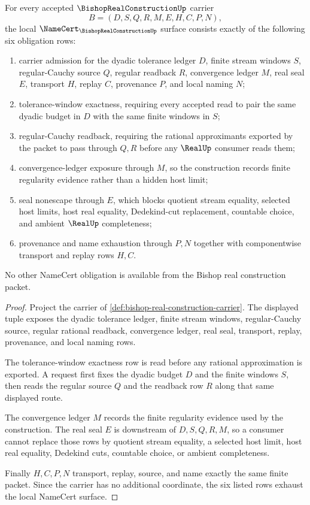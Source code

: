 \begin{theorem}
\label{thm:bishop-real-construction-namecert-obligations}
For every accepted $\BishopRealConstructionUp$ carrier
$$
B=(D,S,Q,R,M,E,H,C,P,N),
$$
the local $\NameCert_{\BishopRealConstructionUp}$ surface consists exactly of the following six obligation rows:
\begin{enumerate}
\item carrier admission for the dyadic tolerance ledger $D$, finite stream windows $S$, regular-Cauchy source $Q$, regular readback $R$, convergence ledger $M$, real seal $E$, transport $H$, replay $C$, provenance $P$, and local naming $N$;
\item tolerance-window exactness, requiring every accepted read to pair the same dyadic budget in $D$ with the same finite windows in $S$;
\item regular-Cauchy readback, requiring the rational approximants exported by the packet to pass through $Q,R$ before any $\RealUp$ consumer reads them;
\item convergence-ledger exposure through $M$, so the construction records finite regularity evidence rather than a hidden host limit;
\item seal nonescape through $E$, which blocks quotient stream equality, selected host limits, host real equality, Dedekind-cut replacement, countable choice, and ambient $\RealUp$ completeness;
\item provenance and name exhaustion through $P,N$ together with componentwise transport and replay rows $H,C$.
\end{enumerate}
No other NameCert obligation is available from the Bishop real construction packet.
\end{theorem}
\begin{proof}
Project the carrier of \autoref{def:bishop-real-construction-carrier}. The displayed tuple exposes the dyadic tolerance ledger, finite stream windows, regular-Cauchy source, regular rational readback, convergence ledger, real seal, transport, replay, provenance, and local naming rows.

The tolerance-window exactness row is read before any rational approximation is exported. A request first fixes the dyadic budget $D$ and the finite windows $S$, then reads the regular source $Q$ and the readback row $R$ along that same displayed route.

The convergence ledger $M$ records the finite regularity evidence used by the construction. The real seal $E$ is downstream of $D,S,Q,R,M$, so a consumer cannot replace those rows by quotient stream equality, a selected host limit, host real equality, Dedekind cuts, countable choice, or ambient completeness.

Finally $H,C,P,N$ transport, replay, source, and name exactly the same finite packet. Since the carrier has no additional coordinate, the six listed rows exhaust the local NameCert surface.
\end{proof}

